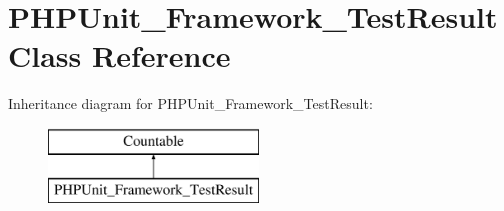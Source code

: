 \hypertarget{class_p_h_p_unit___framework___test_result}{}\section{P\+H\+P\+Unit\+\_\+\+Framework\+\_\+\+Test\+Result Class Reference}
\label{class_p_h_p_unit___framework___test_result}
Inheritance diagram for P\+H\+P\+Unit\+\_\+\+Framework\+\_\+\+Test\+Result\+:\begin{figure}[H]
\begin{center}
\leavevmode
\includegraphics[height=2.000000cm]{class_p_h_p_unit___framework___test_result}
\end{center}
\end{figure}
